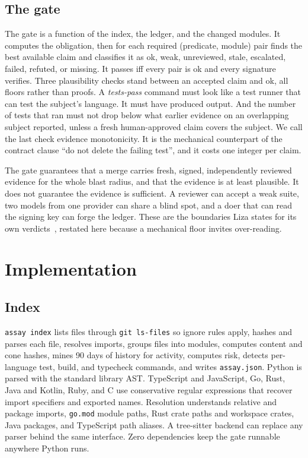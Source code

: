 \documentclass[conference]{IEEEtran}
\begin{document}
\subsection{The gate}

The gate is a function of the index, the ledger, and the changed modules. It computes the obligation, then for each required (predicate, module) pair finds the best available claim and classifies it as ok, weak, unreviewed, stale, escalated, failed, refuted, or missing. It passes iff every pair is ok and every signature verifies. Three plausibility checks stand between an accepted claim and ok, all floors rather than proofs. A \emph{tests-pass} command must look like a test runner that can test the subject's language. It must have produced output. And the number of tests that ran must not drop below what earlier evidence on an overlapping subject reported, unless a fresh human-approved claim covers the subject. We call the last check evidence monotonicity. It is the mechanical counterpart of the contract clause ``do not delete the failing test'', and it costs one integer per claim.

The gate guarantees that a merge carries fresh, signed, independently reviewed evidence for the whole blast radius, and that the evidence is at least plausible. It does not guarantee the evidence is sufficient. A reviewer can accept a weak suite, two models from one provider can share a blind spot, and a doer that can read the signing key can forge the ledger. These are the boundaries Liza states for its own verdicts~\citep{liza}, restated here because a mechanical floor invites over-reading.

\section{Implementation}

\subsection{Index}

\texttt{assay index} lists files through \texttt{git ls-files} so ignore rules apply, hashes and parses each file, resolves imports, groups files into modules, computes content and cone hashes, mines 90 days of history for activity, computes risk, detects per-language test, build, and typecheck commands, and writes \texttt{assay.json}. Python is parsed with the standard library AST. TypeScript and JavaScript, Go, Rust, Java and Kotlin, Ruby, and C use conservative regular expressions that recover import specifiers and exported names. Resolution understands relative and package imports, \texttt{go.mod} module paths, Rust crate paths and workspace crates, Java packages, and TypeScript path aliases. A tree-sitter backend can replace any parser behind the same interface. Zero dependencies keep the gate runnable anywhere Python runs.
\end{document}
